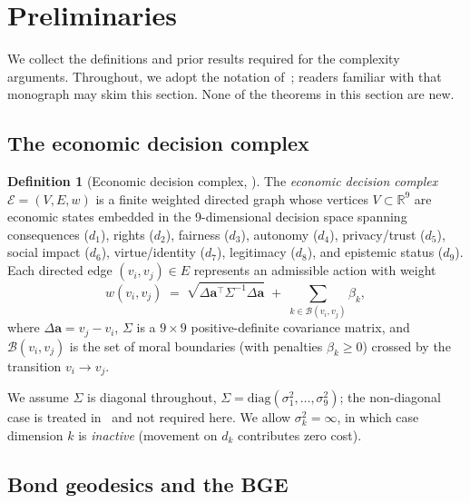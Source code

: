 \documentclass[11pt]{article}
\theoremstyle{definition}
\newtheorem{definition}[theorem]{Definition}
\theoremstyle{remark}
\newcommand{\E}{\mathcal{E}}
\newcommand{\R}{\mathbb{R}}
\begin{document}
\section{Preliminaries}
\label{sec:prelim}

We collect the definitions and prior results required for the complexity arguments. Throughout, we
adopt the notation of~\cite{bond2026geometric}; readers familiar with that monograph may skim this
section. None of the theorems in this section are new.

\subsection{The economic decision complex}

\begin{definition}[Economic decision complex, \cite{bond2026geometric}]
\label{def:complex}
The \emph{economic decision complex} $\E = (V, E, w)$ is a finite weighted directed graph whose
vertices $V \subset \R^9$ are economic states embedded in the 9-dimensional decision space spanning
\textsf{consequences} ($d_1$), \textsf{rights} ($d_2$), \textsf{fairness} ($d_3$), \textsf{autonomy}
($d_4$), \textsf{privacy/trust} ($d_5$), \textsf{social impact} ($d_6$), \textsf{virtue/identity}
($d_7$), \textsf{legitimacy} ($d_8$), and \textsf{epistemic status} ($d_9$). Each directed edge
$(v_i, v_j) \in E$ represents an admissible action with weight
\begin{equation}
\label{eq:edge-weight}
w(v_i, v_j) \;=\; \sqrt{\Delta\mathbf{a}^\top \Sigma^{-1} \Delta\mathbf{a}}
                \;+\; \sum_{k \in \mathcal{B}(v_i, v_j)} \beta_k,
\end{equation}
where $\Delta\mathbf{a} = v_j - v_i$, $\Sigma$ is a $9 \times 9$ positive-definite covariance matrix,
and $\mathcal{B}(v_i, v_j)$ is the set of moral boundaries (with penalties $\beta_k \geq 0$) crossed
by the transition $v_i \to v_j$.
\end{definition}

We assume $\Sigma$ is diagonal throughout, $\Sigma = \mathrm{diag}(\sigma_1^2, \ldots, \sigma_9^2)$;
the non-diagonal case is treated in~\cite{bond2026geometric} and not required here. We allow
$\sigma_k^2 = \infty$, in which case dimension $k$ is \emph{inactive} (movement on $d_k$ contributes
zero cost).

\subsection{Bond geodesics and the BGE}
\end{document}

